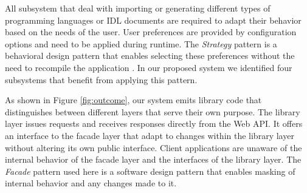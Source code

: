 All subsystem that deal with importing or generating different types of programming languages or IDL documents are required to adapt their behavior based on the needs of the user. User preferences are provided by configuration options and need to be applied during runtime. The \textit{Strategy} pattern \cite{gamma_design_1995} is a behavioral design pattern that enables selecting these preferences without the need to recompile the application \cite{bruegge_object-oriented_2010}. In our proposed system we identified four subsystems that benefit from applying this pattern.

As shown in Figure \ref{fig:outcome}, our system emits library code that distinguishes between different layers that serve their own purpose. The library layer issues requests and receives responses directly from the Web API. It offers an interface to the facade layer that adapt to changes within the library layer without altering its own public interface. Client applications are unaware of the internal behavior of the facade layer and the interfaces of the library layer. The \textit{Facade} pattern \cite{gamma_design_1995} used here is a software design pattern that enables masking of internal behavior and any changes made to it.
 
